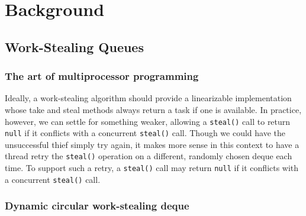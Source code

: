 
\chapter{Background}
\label{chap:queues-background}

\section{Work-Stealing Queues}
\label{sec:queues-background-work-stealing-queues}



\subsection{The art of multiprocessor programming \cite{Herlihy2008}}

Ideally, a work-stealing algorithm should provide a linearizable
implementation whose take and steal methods always return a task if
one is available. In practice, however, we can settle for something
weaker, allowing a \lstinline!steal()! call to return \lstinline!null!
if it conflicts with a concurrent \lstinline!steal()! call. Though we
could have the unsuccessful thief simply try again, it makes more
sense in this context to have a thread retry the \lstinline!steal()!
operation on a different, randomly chosen deque each time. To support
such a retry, a \lstinline!steal()! call may return \lstinline!null!
if it conflicts with a concurrent \lstinline!steal()! call.


\subsection{Dynamic circular work-stealing deque \cite{Chase2005}}

